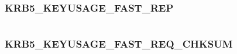 \documentclass[letterpaper,10pt,english]{sphinxmanual}
\begin{document}
\begin{fulllineitems}
\label{appdev/refs/macros/KRB5_KEYUSAGE_FAST_FINISHED:KRB5_KEYUSAGE_FAST_FINISHED}
\end{fulllineitems}


\begin{tabulary}{\linewidth}{|L|L|}
\hline

 & 
\\
\hline\end{tabulary}



\subsubsection{KRB5\_KEYUSAGE\_FAST\_REP}
\label{appdev/refs/macros/KRB5_KEYUSAGE_FAST_REP:krb5-keyusage-fast-rep-data}\label{appdev/refs/macros/KRB5_KEYUSAGE_FAST_REP::doc}\label{appdev/refs/macros/KRB5_KEYUSAGE_FAST_REP:krb5-keyusage-fast-rep}

\begin{fulllineitems}
\label{appdev/refs/macros/KRB5_KEYUSAGE_FAST_REP:KRB5_KEYUSAGE_FAST_REP}
\end{fulllineitems}


\begin{tabulary}{\linewidth}{|L|L|}
\hline

 & 
\\
\hline\end{tabulary}



\subsubsection{KRB5\_KEYUSAGE\_FAST\_REQ\_CHKSUM}
\label{appdev/refs/macros/KRB5_KEYUSAGE_FAST_REQ_CHKSUM:krb5-keyusage-fast-req-chksum-data}\label{appdev/refs/macros/KRB5_KEYUSAGE_FAST_REQ_CHKSUM::doc}\label{appdev/refs/macros/KRB5_KEYUSAGE_FAST_REQ_CHKSUM:krb5-keyusage-fast-req-chksum}

\begin{fulllineitems}
\label{appdev/refs/macros/KRB5_KEYUSAGE_FAST_REQ_CHKSUM:KRB5_KEYUSAGE_FAST_REQ_CHKSUM}
\end{fulllineitems}
\end{document}
